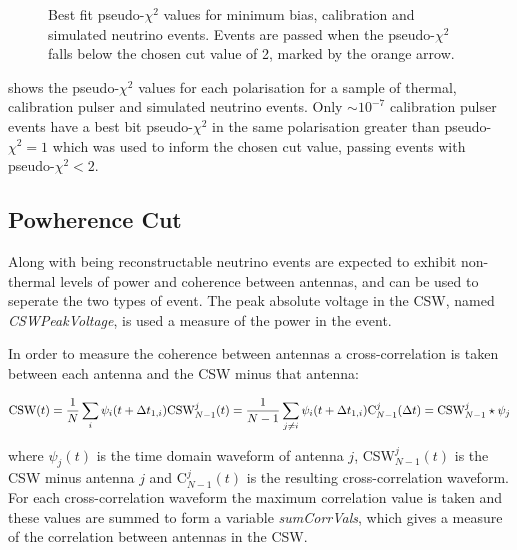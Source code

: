\begin{figure}
  \hfill
  \caption{Best fit pseudo-$\chi^{2}$ values for minimum bias, calibration and simulated neutrino events. Events are passed when the pseudo-$\chi^{2}$ falls below the chosen cut value of 2, marked by the orange arrow.}
  \label{fig:Analysis:Thermal-Cuts:Pseudo-ChiSq}
\end{figure}
  
 shows the pseudo-$\chi^{2}$ values for each polarisation for a sample of thermal, calibration pulser and simulated neutrino events. Only $\sim 10^{-7}$ calibration pulser events have a best bit pseudo-$\chi^{2}$ in the same polarisation greater than pseudo-$\chi^{2}=1$ which was used to inform the chosen cut value, passing events with pseudo-$\chi^{2} < 2$. 

\subsection{Powherence Cut}
\label{sec:Analysis:Thermal-Cuts:Powherence}

Along with being reconstructable neutrino events are expected to exhibit non-thermal levels of power and coherence between antennas, and can be used to seperate the two types of event. The peak absolute voltage in the CSW, named \textit{CSWPeakVoltage}, is used a measure of the power in the event. 

In order to measure the coherence between antennas a cross-correlation is taken between each antenna and the CSW minus that antenna:

\begin{equation}
  \mbox{CSW}(t) = \frac{1}{N}\sum_{i} \psi_{i}(t+\Delta t_{1,i})\\
  \mbox{CSW}_{N-1}^{j}(t) = \frac{1}{N-1}\sum_{j \neq i} \psi_{i}(t+\Delta t_{1,i})\\
  \mbox{C}_{N-1}^{j}(\Delta t) = {\mbox{CSW}_{N-1}^{j} \star \psi_{j}}
\end{equation}

\noindent where $\psi_{j}(t)$ is the time domain waveform of antenna $j$, CSW$_{N-1}^{j}(t)$ is the CSW minus antenna $j$ and C$_{N-1}^{j}(t)$ is the resulting cross-correlation waveform. For each cross-correlation waveform the maximum correlation value is taken and these values are summed to form a variable \textit{sumCorrVals}, which gives a measure of the correlation between antennas in the CSW.

